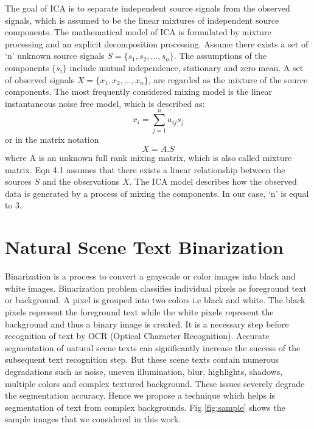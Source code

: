 The goal of ICA is to separate independent 
source signals from the observed signals, which is assumed 
to be the linear mixtures of independent source components. 
The mathematical model of ICA is formulated by 
mixture processing and an explicit decomposition processing.  
Assume there exists a set of `n' unknown source signals 
$S=\{s_1, s_2,..., s_n \}$. The assumptions of the components 
$\{s_i\}$  include mutual independence, stationary and zero mean. 
A set of observed signals $X=\{x_1,x_2,...,x_n\}$, are regarded as the mixture of the source 
components. The most frequently considered 
mixing model is the linear instantaneous noise free model,
which is described as: 
\begin{equation}
x_i=\sum_{j=1}^{n}a_{ij}s_j 
\end{equation}or in the matrix notation
\begin{equation}
X=A.S  
\end{equation}where A is an unknown full rank mixing matrix, which is 
also called mixture matrix. Eqn 4.1 assumes that there exists a 
linear relationship between the sources $S$ and the observations 
$X$. The ICA model describes how the observed data is 
generated by a process of mixing the components. In our case, `n' is equal to 3. 


\section{Natural Scene Text Binarization}
Binarization is a process to convert a grayscale or color 
images into black and white images. Binarization 
problem classifies individual pixels as foreground text or 
background. A pixel is grouped into two colors i.e black and white. The black pixels represent the 
foreground text while the white pixels represent the background and thus a binary image is created.
It is a necessary step before recognition of text by OCR (Optical Character Recognition). 
Accurate segmentation of natural scene texts can significantly increase the success of
the subsequent text recognition step. 
But these scene texts contain numerous degradations 
such as noise, uneven
illumination, blur, highlights, shadows,  multiple colors and complex textured background.
These issues severely degrade the segmentation accuracy. Hence we propose a technique which helps is 
segmentation of text from complex backgrounds.
Fig \ref{fig:sample} shows the sample images that we considered in this work.

